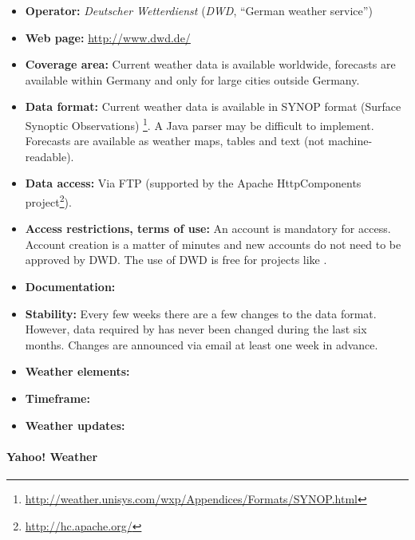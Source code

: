 \begin{itemize}
  \item \textbf{Operator:} \emph{Deutscher Wetterdienst} (\emph{DWD}, ``German weather service'')
  \item \textbf{Web page:} \href{http://www.dwd.de/}{http://www.dwd.de/}
  \item \textbf{Coverage area:} Current weather data is available worldwide, forecasts are available within Germany and only for large cities outside Germany.
  \item \textbf{Data format:} Current weather data is available in SYNOP format (Surface Synoptic Observations) \footnote{\href{http://weather.unisys.com/wxp/Appendices/Formats/SYNOP.html}{http://weather.unisys.com/wxp/Appendices/Formats/SYNOP.html}}. A Java parser may be difficult to implement. Forecasts are available as weather maps, tables and text (not machine-readable).
  \item \textbf{Data access:} Via FTP (supported by the Apache HttpComponents project\footnote{\href{http://hc.apache.org/}{http://hc.apache.org/}}).
  \item \textbf{Access restrictions, terms of use:} An account is mandatory for access. Account creation is a matter of minutes and new accounts do not need to be approved by DWD. The use of DWD is free for projects like \thinkhome. %
  \item \textbf{Documentation:} %
  \item \textbf{Stability:} Every few weeks there are a few changes to the data format. However, data required by \thinkhome has never been changed during the last six months. Changes are announced via email at least one week in advance.
  \item \textbf{Weather elements:} %
  \item \textbf{Timeframe:} %
  \item \textbf{Weather updates:} %
\end{itemize}

\paragraph{Yahoo! Weather}

